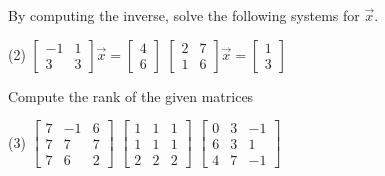 \begin{exercise}
By computing the inverse,
solve the following systems for $\vec{x}$.
\begin{tasks}(2)
\task
$\begin{bmatrix}
-1 & 1 \\
3 & 3
\end{bmatrix} \vec{x} =
\begin{bmatrix} 4 \\ 6 \end{bmatrix}$
\task
$\begin{bmatrix}
2 & 7 \\
1 & 6
\end{bmatrix} \vec{x} =
\begin{bmatrix} 1 \\ 3 \end{bmatrix}$
\end{tasks}
\end{exercise}

\begin{exercise} \label{exercise:rankmatrixans}
Compute the rank of the given matrices
\begin{tasks}(3)
\task
$\begin{bmatrix}
7 & -1 & 6 \\
7 & 7 & 7 \\
7 & 6 & 2
\end{bmatrix}$
\task
$\begin{bmatrix}
1 & 1 & 1 \\
1 & 1 & 1 \\
2 & 2 & 2
\end{bmatrix}$
\task
$\begin{bmatrix}
0 & 3 & -1 \\
6 & 3 & 1 \\
4 & 7 & -1
\end{bmatrix}$
\end{tasks}
\end{exercise}

